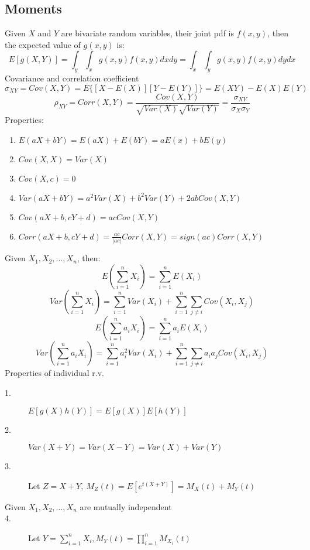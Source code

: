 \documentclass[12pt]{article}
\begin{document}
\subsection*{Moments}
Given $X$ and $Y$ are bivariate random variables, their joint pdf is $f(x,y)$, then the expected value of $g(x,y)$ is:
\newline
\begin{equation}
    E[g(X,Y)]=\int_y\int_x g(x,y)f(x,y)dxdy = \int_x\int_y g(x,y)f(x,y)dydx
\end{equation}
\newline
\newline
Covariance and correlation coefficient
\newline
\begin{equation}
    \sigma_{XY}=Cov(X,Y)=E\{[X-E(X)][Y-E(Y)]\}=E(XY)-E(X)E(Y)
\end{equation}
\begin{equation}
    \rho_{XY}=Corr(X,Y)=\frac{Cov(X,Y)}{\sqrt{Var(X)}\sqrt{Var(Y)}}=\frac{\sigma_{XY}}{\sigma_X \sigma_Y}
\end{equation}
\newpage
Properties:
\begin{enumerate}
    \item $E(aX+bY)=E(aX)+E(bY)=aE(x)+bE(y)$
    \item $Cov(X,X)=Var(X)$
    \item $Cov(X,c)=0$
    \item $Var(aX+bY)=a^2Var(X)+b^2Var(Y)+2abCov(X,Y)$
    \item $Cov(aX+b,cY+d)=acCov(X,Y)$
    \item $Corr(aX+b,cY+d)=\frac{ac}{|ac|}Corr(X,Y)=sign(ac)Corr(X,Y)$
\end{enumerate}
Given $X_1,X_2,\ldots, X_n$, then:
\begin{equation}
    E(\sum_{i=1}^n X_i)=\sum_{i=1}^n E(X_i)
\end{equation}
\begin{equation}
    Var(\sum_{i=1}^n X_i)=\sum_{i=1}^n Var(X_i)+\sum_{i=1}^n\sum_{j\neq i}Cov(X_i,X_j)
\end{equation}
\begin{equation}
    E(\sum_{i=1}^n a_i X_i)=\sum_{i=1}^n a_i E(X_i)
\end{equation}
\begin{equation}
    Var(\sum_{i=1}^n a_i X_i)=\sum_{i=1}^n a_i^2 Var(X_i)+\sum_{i=1}^n \sum_{j \neq i}a_i a_j Cov(X_i, X_j)
\end{equation}
Properties of individual r.v.
\begin{description}
    \item[1.] $E[g(X)h(Y)]=E[g(X)]E[h(Y)]$
    \item[2.] $Var(X+Y)=Var(X-Y)=Var(X)+Var(Y)$
    \item[3.] Let $Z=X+Y,\ M_Z(t)=E[e^{t(X+Y)}]=M_X(t)+M_Y(t)$
    \item[Given $X_1, X_2, \ldots , X_n$ are mutually independent]
    \item[4.] Let $Y=\sum_{i=1}^n X_i, M_Y(t)=\prod_{i=1}^n M_{X_i}(t)$
\end{description}
\end{document}

